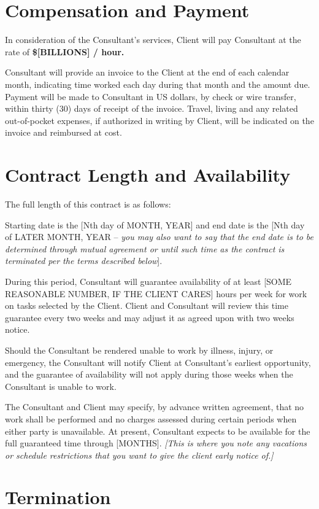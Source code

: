 \documentclass[10pt]{article}
\begin{document}
\section{Compensation and Payment}

In consideration of the Consultant's services, Client will pay
Consultant at the rate of {\bf \$[BILLIONS] / hour.}

Consultant will provide an invoice to the Client at the end of each calendar
month, indicating time worked each day during that month and the
amount due.  Payment will be made to Consultant in US dollars, by check or
wire transfer, within thirty (30) days of receipt of the invoice.  Travel,
living and any related out-of-pocket expenses, if authorized in writing by
Client, will be indicated on the invoice and reimbursed at cost.


\section{Contract Length and Availability}

The full length of this contract is as follows:

Starting date is the [Nth day of MONTH, YEAR] and end date is the [Nth day of LATER MONTH, YEAR -- {\em you may also want to say that the end date is to be determined through mutual agreement or until such time as the contract is terminated per the terms described below}].

During this period, Consultant will guarantee availability of at least [SOME REASONABLE NUMBER, IF THE CLIENT CARES]
hours per week for work on tasks selected by the Client.  Client and
Consultant will review this time guarantee every two weeks and may adjust it
as agreed upon with two weeks notice.

Should the Consultant be rendered unable to work by illness, injury, or
emergency, the Consultant will notify Client at Consultant's earliest
opportunity, and the guarantee of availability will not apply during those
weeks when the Consultant is unable to work.

The Consultant and Client may specify, by advance written agreement, that no
work shall be performed and no charges assessed during certain periods when
either party is unavailable.  At present, Consultant expects to be available
for the full guaranteed time through [MONTHS]. {\em [This is where you note any vacations or schedule restrictions that you want to give the client early notice of.]}


\section{Termination}
\end{document}
